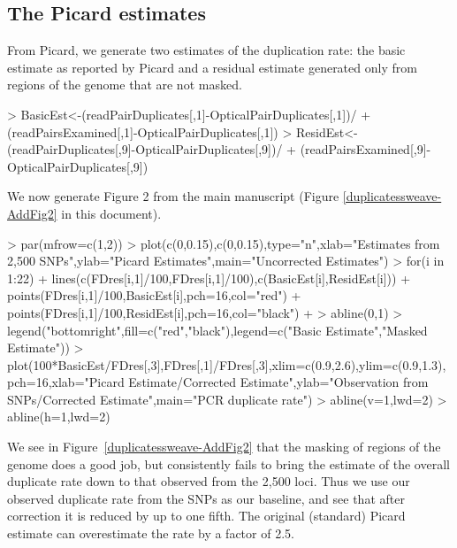 \documentclass{article}
\begin{document}
\subsection{The Picard estimates}

From Picard, we generate two estimates of the duplication rate: the basic estimate as reported by Picard and a residual estimate generated only from regions of the genome that are not masked. 

\begin{Schunk}
\begin{Sinput}
>   BasicEst<-(readPairDuplicates[,1]-OpticalPairDuplicates[,1])/
+   (readPairsExamined[,1]-OpticalPairDuplicates[,1])
>   ResidEst<-(readPairDuplicates[,9]-OpticalPairDuplicates[,9])/
+   (readPairsExamined[,9]-OpticalPairDuplicates[,9])
\end{Sinput}
\end{Schunk}


We now generate Figure 2 from the main manuscript (Figure \ref{duplicatessweave-AddFig2} in this document).

\begin{Schunk}
\begin{Sinput}
>   par(mfrow=c(1,2))
> plot(c(0,0.15),c(0,0.15),type="n",xlab="Estimates from 2,500 SNPs",ylab="Picard Estimates",main="Uncorrected Estimates")
> for(i in 1:22){
+ lines(c(FDres[i,1]/100,FDres[i,1]/100),c(BasicEst[i],ResidEst[i]))
+ points(FDres[i,1]/100,BasicEst[i],pch=16,col="red")
+ points(FDres[i,1]/100,ResidEst[i],pch=16,col="black")
+ }
> abline(0,1)
> legend("bottomright",fill=c("red","black"),legend=c("Basic Estimate","Masked Estimate"))
> plot(100*BasicEst/FDres[,3],FDres[,1]/FDres[,3],xlim=c(0.9,2.6),ylim=c(0.9,1.3),pch=16,xlab="Picard Estimate/Corrected Estimate",ylab="Observation from SNPs/Corrected Estimate",main="PCR duplicate rate")
> abline(v=1,lwd=2)
> abline(h=1,lwd=2)
\end{Sinput}
\end{Schunk}


We see in Figure~\ref{duplicatessweave-AddFig2} that the masking of regions of the genome does a good job, but consistently fails to bring the estimate of the overall duplicate rate down to that observed from the 2,500 loci. Thus we use our observed duplicate rate from the SNPs as our baseline, and see that after correction it is reduced by up to one fifth. The original (standard) Picard estimate can overestimate the rate by a factor of 2.5.
\end{document}
